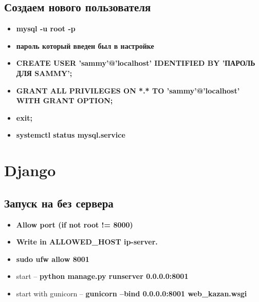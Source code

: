 \documentclass[14pt,a4paper,oneside]{extarticle}
\begin{document}
            \subsection{Создаем нового пользователя}
                \begin{itemize}
                    \item \textbf{mysql -u root -p}
                    \item \textbf{пароль который введен был в настройке}
                    \item \textbf{CREATE USER 'sammy'@'localhost' IDENTIFIED BY 'ПАРОЛЬ ДЛЯ SAMMY';}
                    \item \textbf{GRANT ALL PRIVILEGES ON *.* TO 'sammy'@'localhost' WITH GRANT OPTION;}
                    \item \textbf{exit;}
                    \item \textbf{systemctl status mysql.service}
                \end{itemize}
    
    \newpage

    \section{Django}

        \subsection{Запуск на без сервера}
            \begin{itemize}
                \item \textbf{Allow port (if not root != 8000)}
                \item \textbf{Write in ALLOWED\_HOST ip-server.}
                \item \textbf{sudo ufw allow 8001}
                \item start -- \textbf{python manage.py runserver 0.0.0.0:8001}
                \item start with gunicorn -- \textbf{gunicorn --bind 0.0.0.0:8001 web\_kazan.wsgi}
            \end{itemize}
        
\end{document}
